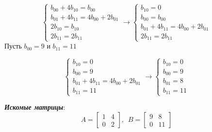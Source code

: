 \documentclass[a5paper, 10pt]{article}
\theoremstyle{definition}
\theoremstyle{plain}
\theoremstyle{remark}
\begin{document}
\begin{equation}
\begin{cases}
b_{0 0} + 4b_{1 0} = b_{0 0}\\
b_{0 1} + 4 b_{1 1} = 4b_{0 0} + 2b_{0 1}\\
2b_{1 0} = b_{1 0}\\
2 b_{1 1} = 2b_{1 1}
\end{cases}
\to
\begin{cases}
b_{1 0} = 0\\
b_{0 0} = b_{0 0}\\
b_{0 1} + 4 b_{1 1} = 4b_{0 0} + 2b_{0 1}\\
2 b_{1 1} = 2b_{1 1}
\end{cases}
\end{equation}
Пусть $b_{0 0} = 9$ и $b_{1 1} = 11$

\begin{equation}
\begin{cases}
b_{1 0} = 0\\
b_{0 0} = 9\\
b_{0 1} + 4 b_{1 1} = 4b_{0 0} + 2b_{0 1}\\
 b_{1 1} = 11
\end{cases}
\to
\begin{cases}
b_{1 0} = 0\\
b_{0 0} = 9\\
b_{0 1} = 8\\
 b_{1 1} = 11
\end{cases}
\end{equation}


\textit{\textbf{Искомые матрицы}}:
\begin{equation}
A=
\begin{bmatrix}
1 & 4\\
0 & 2
\end{bmatrix}
, \, \, \, 
B=
\begin{bmatrix}
9 & 8\\
0 & 11
\end{bmatrix}
\end{equation}
\end{document}
